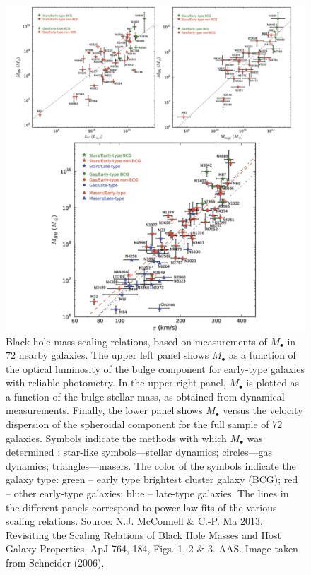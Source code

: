 \documentclass[a4paper,10pt]{article}
\begin{document}
\begin{figure}[t!]
    \centering
    \includegraphics[width=15cm]{figures/BHcorrelations.png}
    \caption{\footnotesize{Black hole mass scaling relations, based on measurements of $M_\bullet$ in $72$ nearby galaxies. The upper left panel shows $M_\bullet$ as a function of the optical luminosity of the bulge component for early-type galaxies with reliable photometry. In the upper right panel, $M_\bullet$ is plotted as a function of the bulge stellar mass, as obtained from dynamical measurements. Finally, the lower panel shows $M_\bullet$ versus the velocity dispersion of the spheroidal component for the full sample of $72$ galaxies. Symbols indicate the methods with which $M_\bullet$ was determined : star-like symbols—stellar dynamics; circles—gas dynamics; triangles—masers. The color of the symbols indicate the galaxy type: green -- early type brightest cluster galaxy (BCG); red -- other early-type galaxies; blue -- late-type galaxies. The lines in the different panels correspond to power-law fits of the various scaling relations. Source: N.J. McConnell \& C.-P. Ma 2013, Revisiting the Scaling Relations of Black Hole Masses and Host Galaxy Properties, ApJ 764, 184, Figs. 1, 2 \& 3. AAS. Image taken from Schneider (2006).}}
    \label{fig:bhcorrelations}
\end{figure}
\end{document}
